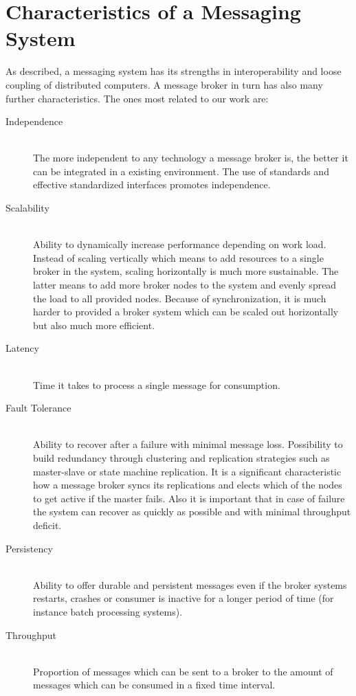 \newpage
\section{Characteristics of a Messaging System}
\label{intro-messaging-characteristics}

As described, a messaging system has its strengths in interoperability and loose
coupling of distributed computers. 
A message broker in turn has also many further
characteristics. The ones most related to our work are:

\begin{description}
    \item [Independence] \hfill \\
    {   The more independent to any technology a message broker is, the better
        it can be integrated in a existing environment. The use of standards and
        effective standardized interfaces promotes independence.}
    \item [Scalability] \hfill \\
    {   Ability to dynamically increase performance depending on work load.
        Instead of scaling vertically which means to add resources to a single
        broker in the system, scaling horizontally is much more sustainable. The
        latter means to add more broker nodes to the system and evenly spread the
        load to all provided nodes. Because of synchronization, it is much
        harder to provided a broker system which can be scaled out horizontally
        but also much more efficient. }
    \item [Latency]\hfill \\
    {    Time it takes to process a single message for consumption.  }
    \item [Fault Tolerance] \hfill \\
    {    Ability to recover after a failure with minimal message loss.
            Possibility to build redundancy through clustering and
            replication strategies such as master-slave or state machine
            replication. It is a significant characteristic how a
            message broker syncs its replications and elects which of the nodes
            to get active if the master fails. Also it is important that in case
            of failure the system can recover as quickly as possible and with
            minimal throughput deficit.   }
    \item [Persistency] \hfill \\ 
        {Ability to offer durable and persistent messages even if the broker
            systems restarts, crashes or consumer is inactive for a longer period of time
            (for instance batch processing systems). }
    \item [Throughput] \hfill \\
        {Proportion of messages which can be sent to a broker to the amount of
        messages which can be consumed in a fixed time interval.}
\end{description}


